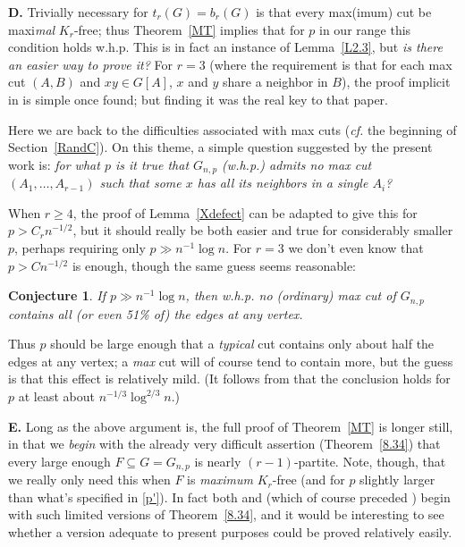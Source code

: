 \documentclass[letterpaper,11pt]{article}
\newtheorem{conj}[thm]{Conjecture}
\newcommand{\mn}[0]{\medskip\noindent}
\newcommand{\nin}[0]{\noindent}
\newcommand{\sub}[0]{\subseteq}
\renewcommand{\dots}[0]{,\ldots,}
\newcommand{\0}[0]{\emptyset}
\begin{document}
\mn
{\bf D.}
Trivially necessary for $t_r(G)=b_r(G)$
is that every max(imum) cut be maxi{\em mal} $K_r$-free;
thus Theorem~\ref{MT} implies
that for $p$ in our
range this condition holds w.h.p.
This is in fact an instance of  Lemma~\ref{L2.3}, but
{\em is there an easier way to prove it?}
%
For $r=3$ (where the requirement is that for each
max cut $(A,B)$ and $xy\in G[A]$, $x$ and $y$ share
a neighbor in $B$), the proof implicit in
\cite{DKMantel} is simple once found; but finding it
was the real key to that paper.

Here we are back to the difficulties associated with max cuts
({\em cf.} the beginning of Section~\ref{RandC}).
On this theme, a simple question suggested by the present work
is:
{\em for what $p$ is it true that
$G_{n,p}$ (w.h.p.) admits no max cut $(A_1\dots A_{r-1})$
such that some $x$ has all its neighbors in a single $A_i$?}
%

When $r\geq 4$, the proof of
Lemma~\ref{Xdefect} can be adapted to give this for
$p>C_rn^{-1/2}$,
but it should really be both
easier and true for considerably smaller $p$, perhaps requiring only
$p\gg n^{-1}\log n$.
For $r=3$ we don't even know that
$p>Cn^{-1/2}$ is enough, though
the same guess seems reasonable:



\begin{conj}\label{CutConj}
If $p\gg n^{-1}\log n$, then w.h.p. no (ordinary) max cut of $G_{n,p}$
contains all (or even 51\% of) the edges at any vertex.
\end{conj}
\nin
Thus $p$ should be large enough that a {\em typical} cut
contains
only about half the edges at any vertex; a {\em max} cut will
of course
tend to contain more, but the guess
is that this effect is relatively mild.
(It follows from \cite[Theorem~1.4]{BPS} that the conclusion holds
for $p$ at least about $n^{-1/3}\log^{2/3}n$.)






\mn
{\bf E.}
Long as the above argument is, the full proof of Theorem~\ref{MT} is
longer still, in that we {\em begin} with the already very difficult
assertion (Theorem~\ref{8.34}) that every large enough $F\sub G=G_{n,p}$
is nearly $(r-1)$-partite.
%
Note, though, that we really only need this when $F$ is {\em maximum} $K_r$-free
(and for $p$ slightly larger than what's specified in \eqref{p'}).
In fact both \cite{BSS} and \cite{BPS} (which of course preceded \cite{Conlon-Gowers})
begin with such limited
versions of Theorem~\ref{8.34}, and it would be interesting to see
whether a version adequate to present purposes could be proved relatively easily.
\end{document}
